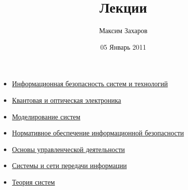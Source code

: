 \documentclass[12pt, russian, oneside, article]{ncc}
\begin{document}
\title{Лекции}
\author{Максим Захаров}
\date{05 Январь 2011}
\maketitle

\setcounter{tocdepth}{3}
\tableofcontents
\vspace*{1cm}

\begin{itemize}
\item \href{file:///home/maxim/Documents/Git/lectures/IBST_Lectures.org}{Информационная безопасность систем и технологий}
\item \href{file:///home/maxim/Documents/Git/lectures/KOE_Lectures.org}{Квантовая и оптическая электроника}
\item \href{file:///home/maxim/Documents/Git/lectures/MS_Lectures.org}{Моделирование систем}
\item \href{file:///home/maxim/Documents/Git/lectures/NOIB_Lectures.org}{Нормативное обеспечение информационной безопасности}
\item \href{file:///home/maxim/Documents/Git/lectures/OUD_Lectures.org}{Основы управленческой деятельности}
\item \href{file:///home/maxim/Documents/Git/lectures/SiSPI_Lectures.org}{Системы и сети передачи информации}
\item \href{file:///home/maxim/Documents/Git/lectures/TS_Lectures.org}{Теория систем}
\end{itemize}
\end{document}
